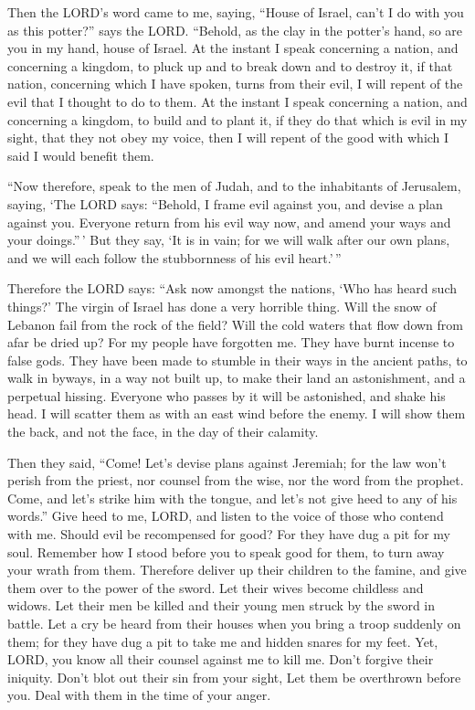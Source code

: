  Then the LORD's word came to me, saying, 
``House of Israel, can't I do with you as this potter?'' says the LORD.
``Behold, as the clay in the potter's hand, so are you in my hand, house
of Israel.  At the instant I speak concerning a nation,
and concerning a kingdom, to pluck up and to break down and to destroy
it,  if that nation, concerning which I have spoken, turns
from their evil, I will repent of the evil that I thought to do to them.
 At the instant I speak concerning a nation, and
concerning a kingdom, to build and to plant it,  if they
do that which is evil in my sight, that they not obey my voice, then I
will repent of the good with which I said I would benefit them.

 ``Now therefore, speak to the men of Judah, and to the
inhabitants of Jerusalem, saying, `The LORD says: ``Behold, I frame evil
against you, and devise a plan against you. Everyone return from his
evil way now, and amend your ways and your doings.''\,' 
But they say, `It is in vain; for we will walk after our own plans, and
we will each follow the stubbornness of his evil heart.'\,''

 Therefore the LORD says: ``Ask now amongst the nations,
`Who has heard such things?' The virgin of Israel has done a very
horrible thing.  Will the snow of Lebanon fail from the
rock of the field? Will the cold waters that flow down from afar be
dried up?  For my people have forgotten me. They have
burnt incense to false gods. They have been made to stumble in their
ways in the ancient paths, to walk in byways, in a way not built up,
 to make their land an astonishment, and a perpetual
hissing. Everyone who passes by it will be astonished, and shake his
head.  I will scatter them as with an east wind before
the enemy. I will show them the back, and not the face, in the day of
their calamity.

 Then they said, ``Come! Let's devise plans against
Jeremiah; for the law won't perish from the priest, nor counsel from the
wise, nor the word from the prophet. Come, and let's strike him with the
tongue, and let's not give heed to any of his words.'' 
Give heed to me, LORD, and listen to the voice of those who contend with
me.  Should evil be recompensed for good? For they have
dug a pit for my soul. Remember how I stood before you to speak good for
them, to turn away your wrath from them.  Therefore
deliver up their children to the famine, and give them over to the power
of the sword. Let their wives become childless and widows. Let their men
be killed and their young men struck by the sword in battle.
 Let a cry be heard from their houses when you bring a
troop suddenly on them; for they have dug a pit to take me and hidden
snares for my feet.  Yet, LORD, you know all their
counsel against me to kill me. Don't forgive their iniquity. Don't blot
out their sin from your sight, Let them be overthrown before you. Deal
with them in the time of your anger.

